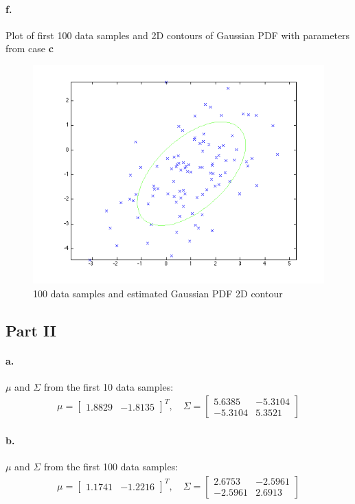 \documentclass[a4paper]{article}
\begin{document}
\paragraph{f.} Plot of first 100 data samples and 2D contours of Gaussian PDF with parameters from case \textbf{c} \\
\begin{figure}[H]
  \centering
    \includegraphics[scale=.47]{images/3_f_I.png}
  \caption{100 data samples and estimated Gaussian PDF 2D contour}
\end{figure}

\subsection*{Part II}

\paragraph{a.} $\mu$ and $\Sigma$ from the first 10 data samples: \\
\begin{align*}
	\mu = \begin{bmatrix}
		1.8829 & -1.8135
	\end{bmatrix}^{T}, \quad
	\Sigma = \begin{bmatrix}
		 5.6385  & -5.3104 \\
		-5.3104  &  5.3521
	\end{bmatrix}
\end{align*}

\paragraph{b.} $\mu$ and $\Sigma$ from the first 100 data samples: \\
\begin{align*}
	\mu = \begin{bmatrix}
		1.1741 & -1.2216
	\end{bmatrix}^{T}, \quad
	\Sigma = \begin{bmatrix}
		 2.6753  & -2.5961 \\
		-2.5961  &  2.6913
	\end{bmatrix}
\end{align*}
\end{document}
